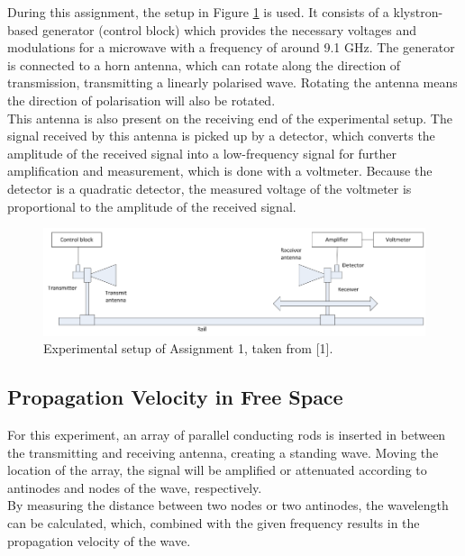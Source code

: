During this assignment, the setup in Figure \ref{fig:Ass1_setup} is used. It consists of a klystron-based generator (control block) which provides the necessary voltages and modulations for a microwave with a frequency of around 9.1 GHz. The generator is connected to a horn antenna, which can rotate along the direction of transmission, transmitting a linearly polarised wave. Rotating the antenna means the direction of polarisation will also be rotated.\\
This antenna is also present on the receiving end of the experimental setup. The signal received by this antenna is picked up by a detector, which converts the amplitude of the received signal into a low-frequency signal for further amplification and measurement, which is done with a voltmeter. Because the detector is a quadratic detector, the measured voltage of the voltmeter is proportional to the amplitude of the received signal.\\

\begin{figure}[h]
    \centering
    \includegraphics[width=1\textwidth]{Session2_files/Assignment1_setup.PNG}
    \caption{Experimental setup of Assignment 1, taken from [1].}
    \label{fig:Ass1_setup}
\end{figure}

\subsection*{Propagation Velocity in Free Space}

For this experiment, an array of parallel conducting rods is inserted in between the transmitting and receiving antenna, creating a standing wave. Moving the location of the array, the signal will be amplified or attenuated according to antinodes and nodes of the wave, respectively.\\
By measuring the distance between two nodes or two antinodes, the wavelength can be calculated, which, combined with the given frequency results in the propagation velocity of the wave.\\

